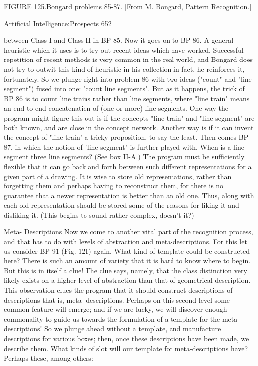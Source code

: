    FIGURE 125.Bongard problems 85-87. [From M. Bongard, Pattern Recognition.]




Artificial Intelligence:Prospects                                                        652

   between Class I and Class II in BP 85. Now it goes on to BP 86. A general
   heuristic which it uses is to try out recent ideas which have worked. Successful
   repetition of recent methods is very common in the real world, and Bongard does
   not try to outwit this kind of heuristic in his collection-in fact, he reinforces it,
   fortunately. So we plunge right into problem 86 with two ideas ("count" and "line
   segment") fused into one: "count line segments". But as it happens, the trick of BP
   86 is to count line trains rather than line segments, where "line train" means an
   end-to-end concatenation of (one or more) line segments. One way the program
   might figure this out is if the concepts "line train" and "line segment" are both
   known, and are close in the concept network. Another way is if it can invent the
   concept of "line train"-a tricky proposition, to say the least.
       Then comes BP 87, in which the notion of "line segment" is further played
   with. When is a line segment three line segments? (See box II-A.) The program
   must be sufficiently flexible that it can go back and forth between such different
   representations for a given part of a drawing. It is wise to store old representations,
   rather than forgetting them and perhaps having to reconstruct them, for there is no
   guarantee that a newer representation is better than an old one. Thus, along with
   each old representation should be stored some of the reasons for liking it and
   disliking it. (This begins to sound rather complex, doesn't it?)

                                    Meta- Descriptions
   Now we come to another vital part of the recognition process, and that has to do
   with levels of abstraction and meta-descriptions. For this let us consider BP 91
   (Fig. 121) again. What kind of template could be constructed here? There is such
   an amount of variety that it is hard to know where to begin. But this is in itself a
   clue! The clue says, namely, that the class distinction very likely exists on a higher
   level of abstraction than that of geometrical description. This observation clues the
   program that it should construct descriptions of descriptions-that is, meta-
   descriptions. Perhaps on this second level some common feature will emerge; and
   if we are lucky, we will discover enough commonality to guide us towards the
   formulation of a template for the meta-descriptions! So we plunge ahead without a
   template, and manufacture descriptions for various boxes; then, once these
   descriptions have been made, we describe them. What kinds of slot will our
   template for meta-descriptions have? Perhaps these, among others:

